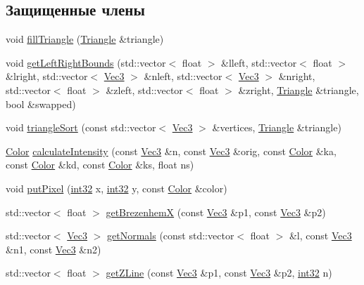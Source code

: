 \subsection*{Защищенные члены}
\begin{DoxyCompactItemize}
\item 
void \hyperlink{class_light_z_buffer_renderer_a48bc043f59326ca98f2821e96710cd41}{fill\+Triangle} (\hyperlink{class_triangle}{Triangle} \&triangle)
\item 
void \hyperlink{class_light_z_buffer_renderer_a4fa5b867bf1e51f603713631d674cb06}{get\+Left\+Right\+Bounds} (std\+::vector$<$ float $>$ \&lleft, std\+::vector$<$ float $>$ \&lright, std\+::vector$<$ \hyperlink{vec3_8h_a221ad8ea4d9be4111628ee1ca22ee3ba}{Vec3} $>$ \&nleft, std\+::vector$<$ \hyperlink{vec3_8h_a221ad8ea4d9be4111628ee1ca22ee3ba}{Vec3} $>$ \&nright, std\+::vector$<$ float $>$ \&zleft, std\+::vector$<$ float $>$ \&zright, \hyperlink{class_triangle}{Triangle} \&triangle, bool \&swapped)
\item 
void \hyperlink{class_light_z_buffer_renderer_a73dff4db530851b997e468bf73eb98ab}{triangle\+Sort} (const std\+::vector$<$ \hyperlink{vec3_8h_a221ad8ea4d9be4111628ee1ca22ee3ba}{Vec3} $>$ \&vertices, \hyperlink{class_triangle}{Triangle} \&triangle)
\item 
\hyperlink{class_color}{Color} \hyperlink{class_light_z_buffer_renderer_ad22c18963eabaa75aea9e26472e24895}{calculate\+Intensity} (const \hyperlink{vec3_8h_a221ad8ea4d9be4111628ee1ca22ee3ba}{Vec3} \&n, const \hyperlink{vec3_8h_a221ad8ea4d9be4111628ee1ca22ee3ba}{Vec3} \&orig, const \hyperlink{class_color}{Color} \&ka, const \hyperlink{class_color}{Color} \&kd, const \hyperlink{class_color}{Color} \&ks, float ns)
\item 
void \hyperlink{class_light_z_buffer_renderer_a5ab92396f07a122fdd9296d2647d5ba9}{put\+Pixel} (\hyperlink{number_8h_a43d43196463bde49cb067f5c20ab8481}{int32} x, \hyperlink{number_8h_a43d43196463bde49cb067f5c20ab8481}{int32} y, const \hyperlink{class_color}{Color} \&color)
\item 
std\+::vector$<$ float $>$ \hyperlink{class_light_z_buffer_renderer_a8f2e11c38172b8a5da977ab951937055}{get\+BrezenhemX} (const \hyperlink{vec3_8h_a221ad8ea4d9be4111628ee1ca22ee3ba}{Vec3} \&p1, const \hyperlink{vec3_8h_a221ad8ea4d9be4111628ee1ca22ee3ba}{Vec3} \&p2)
\item 
std\+::vector$<$ \hyperlink{vec3_8h_a221ad8ea4d9be4111628ee1ca22ee3ba}{Vec3} $>$ \hyperlink{class_light_z_buffer_renderer_ae37535afff9d52ee46c6be7321bca843}{get\+Normals} (const std\+::vector$<$ float $>$ \&l, const \hyperlink{vec3_8h_a221ad8ea4d9be4111628ee1ca22ee3ba}{Vec3} \&n1, const \hyperlink{vec3_8h_a221ad8ea4d9be4111628ee1ca22ee3ba}{Vec3} \&n2)
\item 
std\+::vector$<$ float $>$ \hyperlink{class_light_z_buffer_renderer_a7ba24d9b0fbd7e05b85bc857d147ff52}{get\+Z\+Line} (const \hyperlink{vec3_8h_a221ad8ea4d9be4111628ee1ca22ee3ba}{Vec3} \&p1, const \hyperlink{vec3_8h_a221ad8ea4d9be4111628ee1ca22ee3ba}{Vec3} \&p2, \hyperlink{number_8h_a43d43196463bde49cb067f5c20ab8481}{int32} n)
\end{DoxyCompactItemize}

